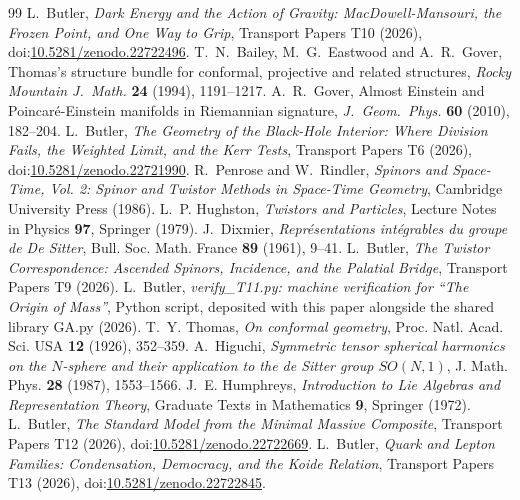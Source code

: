 \documentclass[11pt]{article}
\theoremstyle{definition}
\theoremstyle{plain}
\begin{document}
\begin{thebibliography}{99}
 L.~Butler,
\emph{Dark Energy and the Action of Gravity: MacDowell-Mansouri, the Frozen Point, and One Way to Grip},
Transport Papers T10 (2026), doi:\href{https://doi.org/10.5281/zenodo.22722496}{10.5281/zenodo.22722496}.
 T.~N.~Bailey, M.~G.~Eastwood and A.~R.~Gover,
Thomas's structure bundle for conformal, projective and related structures,
\emph{Rocky Mountain J.\ Math.} \textbf{24} (1994), 1191--1217.
 A.~R.~Gover,
Almost Einstein and Poincar\'e-Einstein manifolds in Riemannian signature,
\emph{J.\ Geom.\ Phys.} \textbf{60} (2010), 182--204.
 L.~Butler,
\emph{The Geometry of the Black-Hole Interior: Where Division Fails, the Weighted Limit, and the Kerr Tests},
Transport Papers T6 (2026), doi:\href{https://doi.org/10.5281/zenodo.22721990}{10.5281/zenodo.22721990}.
 R.~Penrose and W.~Rindler,
\emph{Spinors and Space-Time, Vol. 2: Spinor and Twistor Methods in Space-Time Geometry},
Cambridge University Press (1986).
 L.~P. Hughston,
\emph{Twistors and Particles},
Lecture Notes in Physics \textbf{97}, Springer (1979).
 J.~Dixmier,
\emph{Repr\'esentations int\'egrables du groupe de De Sitter},
Bull. Soc. Math. France \textbf{89} (1961), 9--41.
 L.~Butler,
\emph{The Twistor Correspondence: Ascended Spinors, Incidence, and the Palatial Bridge},
Transport Papers T9 (2026).
 L.~Butler,
\emph{verify\_T11.py: machine verification for ``The Origin of Mass''},
Python script, deposited with this paper alongside the shared library GA.py (2026).
 T.~Y. Thomas,
\emph{On conformal geometry},
Proc. Natl. Acad. Sci. USA \textbf{12} (1926), 352--359.
 A.~Higuchi,
\emph{Symmetric tensor spherical harmonics on the $N$-sphere and their application to the de Sitter group $SO(N,1)$},
J. Math. Phys. \textbf{28} (1987), 1553--1566.
 J.~E. Humphreys,
\emph{Introduction to Lie Algebras and Representation Theory},
Graduate Texts in Mathematics \textbf{9}, Springer (1972).
 L.~Butler,
\emph{The Standard Model from the Minimal Massive Composite},
Transport Papers T12 (2026), doi:\href{https://doi.org/10.5281/zenodo.22722669}{10.5281/zenodo.22722669}.
 L.~Butler,
\emph{Quark and Lepton Families: Condensation, Democracy, and the Koide Relation},
Transport Papers T13 (2026), doi:\href{https://doi.org/10.5281/zenodo.22722845}{10.5281/zenodo.22722845}.

\end{thebibliography}
\end{document}
